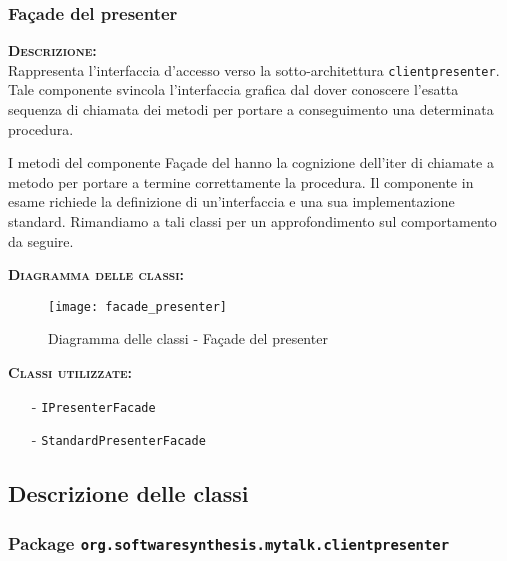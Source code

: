 \subsubsection{Façade del presenter}
\begin{description}
	\item{\scshape\bfseries Descrizione:}\\
Rappresenta l'interfaccia d'accesso verso la sotto-architettura \texttt{clientpresenter}. Tale componente svincola l'interfaccia grafica dal dover conoscere l'esatta sequenza di chiamata dei metodi per portare a conseguimento una determinata procedura.

I metodi del componente Façade del  hanno la cognizione dell'iter di chiamate a metodo per portare a termine correttamente la procedura. Il componente in esame richiede la definizione di un'interfaccia e una sua implementazione standard. Rimandiamo a tali classi per un approfondimento sul comportamento da seguire.
	\item{\scshape\bfseries Diagramma delle classi:}
\begin{figure}[H]
\begin{center}
\texttt{[image: facade\_presenter]}
\caption{Diagramma delle classi - Façade del presenter}\label{fig:facade_presenter}
\end{center}
\end{figure}
	\item{\scshape\bfseries Classi utilizzate:} 
	\begin{itemize}[noitemsep,nolistsep]
		\item[-] \texttt{IPresenterFacade}
		\item[-] \texttt{StandardPresenterFacade}
	\end{itemize}
\end{description}

\subsection{Descrizione delle classi}

\subsubsection{Package \texttt{org.softwaresynthesis.mytalk.clientpresenter}}

